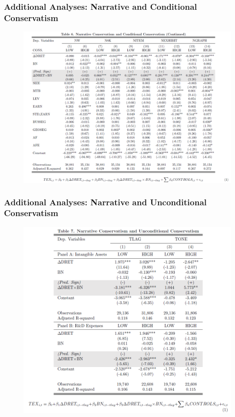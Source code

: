 \documentclass{beamer}
\begin{document}
\begin{frame}
	\frametitle{Additional Analyses: Narrative and Conditional Conservatism}
	\begin{figure}[h]
		\centering
		\includegraphics[width=0.8\linewidth]{tab6_cont}
		\label{tab6_cont}
	\end{figure}
	
\end{frame}
\begin{frame}
	\frametitle{Additional Analyses: Narrative and Unconditional Conservatism}
	\begin{figure}[h]
		\centering
		\includegraphics[width=0.6\linewidth]{tab7}
		\label{tab7}
	\end{figure}
	
\end{frame}
\end{document}
